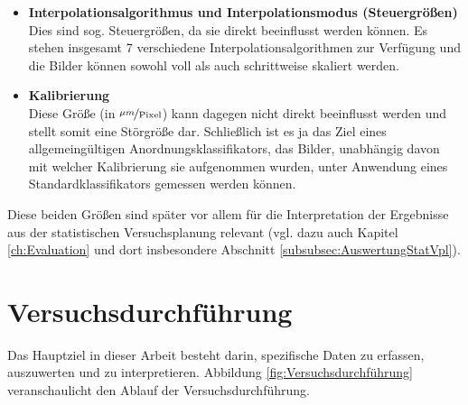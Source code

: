 \documentclass[
fontsize=10pt, 
listof = totoc,
parskip = half	
]{report}
\begin{document}
\begin{itemize}
	\item \textbf{Interpolationsalgorithmus und Interpolationsmodus (Steuergrößen)} \\
	Dies sind sog. Steuergrößen, da sie direkt beeinflusst werden können. Es stehen insgesamt 7 verschiedene Interpolationsalgorithmen zur Verfügung und die Bilder können sowohl voll als auch schrittweise skaliert werden.
	\item \textbf{Kalibrierung} \\
	Diese Größe (in $\nicefrac{\mu m}{\text{Pixel}}$) kann dagegen nicht direkt beeinflusst werden und stellt somit eine Störgröße dar. Schließlich ist es ja das Ziel eines allgemeingültigen Anordnungsklassifikators, das Bilder, unabhängig davon mit welcher Kalibrierung sie aufgenommen wurden, unter Anwendung eines Standardklassifikators gemessen werden können.
\end{itemize}

\noindent Diese beiden Größen sind später vor allem für die Interpretation der Ergebnisse aus der statistischen Versuchsplanung relevant (vgl. dazu auch Kapitel \ref{ch:Evaluation} und dort insbesondere Abschnitt \ref{subsubsec:AuswertungStatVpl}).

\section{Versuchsdurchführung}

Das Hauptziel in dieser Arbeit besteht darin, spezifische Daten zu erfassen, auszuwerten und zu interpretieren. Abbildung \ref{fig:Versuchsdurchführung} veranschaulicht den Ablauf der Versuchsdurchführung.
\end{document}
